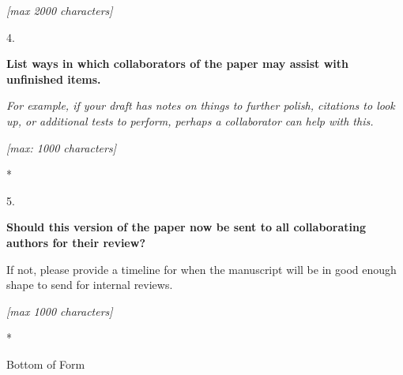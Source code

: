 \documentclass[]{article}
\begin{document}
\emph{{[}max 2000 characters{]}}

4.

\textbf{List ways in which collaborators of the paper may assist with
unfinished items.}

\emph{For example, if your draft has notes on things to further polish,
citations to look up, or additional tests to perform, perhaps a
collaborator can help with this.}

\emph{{[}max: 1000 characters{]}}

*

5.

\textbf{Should this version of the paper now be sent to all
collaborating authors for their review?}

If not, please provide a timeline for when the manuscript will be in
good enough shape to send for internal reviews.

\emph{{[}max 1000 characters{]}}

*

Bottom of Form
\end{document}

